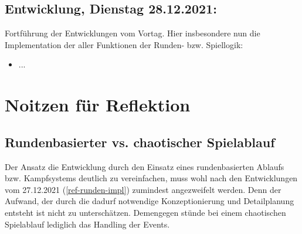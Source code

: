\subsection{Entwicklung, Dienstag 28.12.2021:}

Fortführung der Entwicklungen vom Vortag. Hier insbesondere nun die Implementation der aller Funktionen der Runden- bzw. Spiellogik:

\begin{itemize}
    \item ...
\end{itemize}

\section{Noitzen für Reflektion}

\subsection{Rundenbasierter vs. chaotischer Spielablauf}

Der Ansatz die Entwicklung durch den Einsatz eines rundenbasierten Ablaufs bzw. Kampfsystems deutlich zu vereinfachen, muss wohl nach den Entwicklungen vom 27.12.2021 (\ref{ref-runden-impl}) zumindest angezweifelt werden. Denn der Aufwand, der durch die dadurf notwendige Konzeptionierung und Detailplanung entsteht ist nicht zu unterschätzen. Demengegen stünde bei einem chaotischen Spielablauf lediglich das Handling der Events. 




